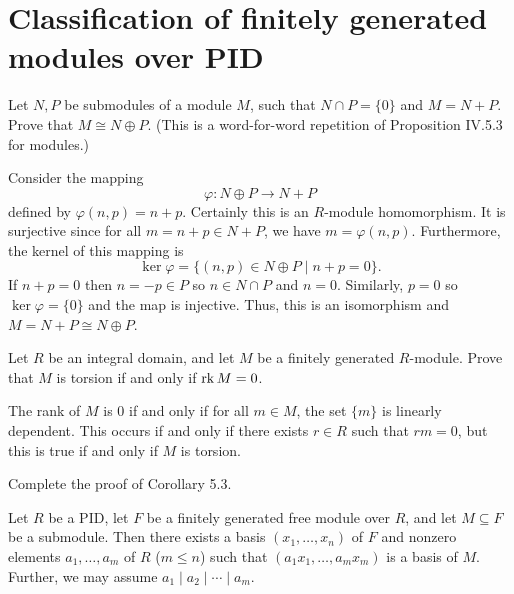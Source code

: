 \documentclass[../../master.tex]{subfiles}
\begin{document}
\section{Classification of finitely generated modules over PID}

\begin{problem}
    Let $N, P$ be submodules of a module $M$, such that $N \cap P = \{0\}$ and $M = N + P$.
    Prove that $M \cong N \oplus P$.
    (This is a word-for-word repetition of Proposition IV.5.3 for modules.)
\end{problem}

\begin{solution}
    Consider the mapping
    \[
    \varphi : N \oplus P \to N + P
    \]
    defined by  $\varphi(n, p) = n + p$.
    Certainly this is an $R$-module homomorphism.
    It is surjective since for all $m = n + p \in N + P$, we have $m = \varphi(n, p)$.
    Furthermore, the kernel of this mapping is
    \[
        \ker \varphi = \{(n, p) \in N \oplus P \mid n + p = 0\}.
    \]
    If $n + p = 0$ then $n = -p \in P$ so $n \in N \cap P$ and $n = 0$.
    Similarly, $p = 0$ so $\ker \varphi = \{0\}$ and the map is injective.
    Thus, this is an isomorphism and $M = N + P \cong N \oplus P$.
\end{solution}

\begin{problem}
    Let $R$ be an integral domain, and let $M$ be a finitely generated $R$-module.
    Prove that $M$ is torsion if and only if $\operatorname{rk} M = 0$.
\end{problem}

\begin{solution}
    The rank of $M$ is 0 if and only if for all $m \in M$, the set $\{m\}$ is linearly dependent.
    This occurs if and only if there exists $r \in R$ such that $rm = 0$, but this is true if and only if $M$ is torsion.
\end{solution}

\begin{problem}
    Complete the proof of Corollary 5.3.
    \begin{proposition}[Corollary 5.3] 
        Let $R$ be a PID, let $F$ be a finitely generated free module over $R$, and let $M \subseteq F$ be a submodule.
        Then there exists a basis $(x_1, \ldots, x_n)$ of $F$ and nonzero elements $a_1, \ldots, a_m$ of $R$ ($m \leq n$) such that $(a_1 x_1, \ldots, a_m x_m)$ is a basis of $M$.
        Further, we may assume $a_1 \mid a_2 \mid \cdots \mid a_m$.
    \end{proposition}
\end{problem}
\end{document}
